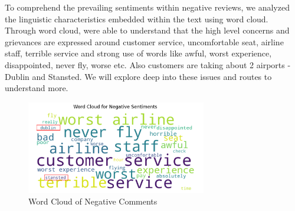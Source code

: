 \documentclass[11pt]{article} %
\begin{document}
To comprehend the prevailing sentiments within negative reviews, we analyzed the linguistic characteristics embedded within the text using word cloud. Through word cloud, were able to understand that the high level concerns and grievances are expressed around customer service, uncomfortable seat, airline staff, terrible service and strong use of words like awful, worst experience, disappointed, never fly, worse etc. Also customers are taking about 2 airports - Dublin and Stansted. We will explore deep into these issues and routes to understand more.
\begin{figure}[H]
    \centering
    \includegraphics[width=0.7\textwidth]{images/word_cloud_freq_words_v1.png}
    \caption{Word Cloud of Negative Comments}
    \label{fig:Word Cloud of Negative Comments}
\end{figure}
\end{document}
